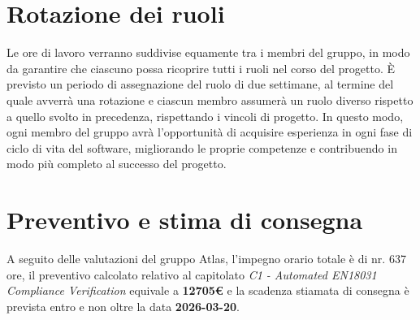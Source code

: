 \documentclass[a4paper,12pt]{article}
\begin{document}
\section{Rotazione dei ruoli}{
    Le ore di lavoro verranno suddivise equamente tra i membri del gruppo, in modo da garantire che ciascuno possa ricoprire tutti i ruoli nel corso del progetto. È previsto un periodo di assegnazione del ruolo di due settimane, al termine del quale avverrà una rotazione e ciascun membro assumerà un ruolo diverso rispetto a quello svolto in precedenza, rispettando i vincoli di progetto. In questo modo, ogni membro del gruppo avrà l'opportunità di acquisire esperienza in ogni fase di ciclo di vita del software, migliorando le proprie competenze e contribuendo in modo più completo al successo del progetto.
}

\section{Preventivo e stima di consegna}{
    A seguito delle valutazioni del gruppo Atlas, l'impegno orario totale è di nr. 637 ore, il preventivo calcolato relativo al capitolato \textit{C1 - Automated EN18031 Compliance Verification} equivale a \textbf{12705€} e la scadenza stiamata di consegna è prevista entro e non oltre la data \textbf{2026-03-20}.
}
\end{document}
